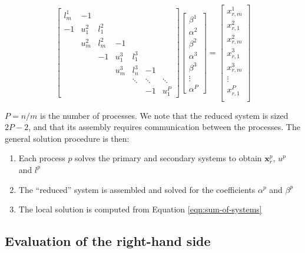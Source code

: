 \documentclass{elsarticle}
\begin{document}
\begin{equation} \label{eqn:reduced-system}
\begin{bmatrix}
l^1_m & -1 \\
-1    & u^2_1 & l^2_1 \\
      & u^2_m & l^2_m & -1 \\
      &       & -1    & u^3_1 & l^3_1 \\
      &       &       & u^3_m & l^3_n  & -1 \\
      &       &       &       & \ddots & \ddots & \ddots \\
      &       &       &       &        & -1     & u^P_1
\end{bmatrix}
\begin{bmatrix}
\beta^1 \\
\alpha^2 \\
\beta^2 \\
\alpha^3 \\
\beta^3 \\
\vdots \\
\alpha^P
\end{bmatrix}
=
\begin{bmatrix}
x_{r,m}^1 \\
x_{r,1}^2 \\
x_{r,m}^2 \\
x_{r,1}^3 \\
x_{r,m}^3 \\
\vdots \\
x_{r,1}^P \\
\end{bmatrix}
\end{equation}

$P = n/m$ is the number of processes.
We note that the reduced system is sized $2P-2$,
and that its assembly requires communication between the processes.
The general solution procedure is then:

\begin{enumerate}
    \item Each process $p$ solves the primary and secondary systems
        to obtain $\boldsymbol{x}_r^p$, $u^p$ and $l^p$
    \item The ``reduced'' system is assembled and solved for
        the coefficients $\alpha^p$ and $\beta^p$
    \item The local solution is computed from Equation \ref{eqn:sum-of-systems}
\end{enumerate}


\subsection{Evaluation of the right-hand side}
\end{document}
